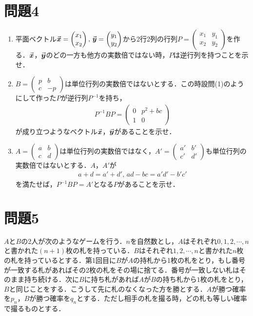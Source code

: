 \documentclass[unicode,12pt, A4j]{ltjsarticle}%
\begin{document}
\section{問題4}
\begin{enumerate}
 \item 平面ベクトル$\va*{x}=\begin{pmatrix}x_1\\x_2\end{pmatrix},\,\va*{y}=\begin{pmatrix}y_1\\y_2\end{pmatrix}$から2行2列の行列$P=\begin{pmatrix} x_1&y_1 \\ x_2&y_2\end{pmatrix}$を作る．$\va*{x}$，$\va*{y}$のどの一方も他方の実数倍ではない時，$P$は逆行列を持つことを示せ．
 \item $B=\begin{pmatrix} p&b \\ c&-p\end{pmatrix}$は単位行列の実数倍ではないとする．この時設問(1)のようにして作った$P$が逆行列$P^{-1}$を持ち，
\begin{align*}
 P^{-1}BP=
 \begin{pmatrix}
  0 & p^2+bc \\
  1 & 0 
 \end{pmatrix}
\end{align*}
が成り立つようなベクトル$\va*{x}$，$\va*{y}$があることを示せ．
 \item $A=\begin{pmatrix} a&b \\ c&d\end{pmatrix}$は単位行列の実数倍ではなく，$A'=\begin{pmatrix} a'&b' \\ c'&d' \end{pmatrix}$も単位行列の実数倍ではないとする．$A$，$A'$が
\begin{align*}
 a+d=a'+d',\, ad-bc=a'd'-b'c'
\end{align*}
を満たせば，$P^{-1}BP=A'$となる$P$があることを示せ．
\end{enumerate}


\section{問題5}
$A$と$B$の2人が次のようなゲームを行う．$n$を自然数とし，$A$はそれぞれ$0,1,2,\cdots,n$と書かれた$(n+1)$枚の札を持っている．$B$はそれぞれ$1,2,\cdots,n$と書かれた$n$枚の札を持っているとする．第1回目に$B$が$A$の持札から1枚の札をとり，もし番号が一致する札があればその2枚の札をその場に捨てる．番号が一致しない札はそのまま持ち続ける．次に$B$に持ち札があれば$A$が$B$の持ち札から$1$枚の札をとり，$B$と同じことをする．こうして先に札のなくなった方を勝とする．$A$が勝つ確率を$p_n$，$B$が勝つ確率を$q_n$とする．ただし相手の札を撮る時，どの札も等しい確率で撮るものとする．
\end{document}
